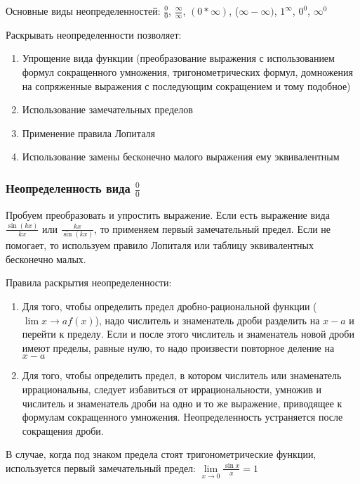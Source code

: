 \documentclass{article}
\begin{document}
\begin{flushleft}

Основные виды неопределенностей: $\frac{0}{0}$, $\frac{\infty}{\infty}$, $(0 * \infty)$, ($\infty - \infty)$, $1^{\infty}$, $0^0$, $\infty^0$

Раскрывать неопределенности позволяет:

\begin{enumerate}
    \item Упрощение вида функции (преобразование выражения с использованием формул сокращенного умножения, тригонометрических формул, домножения на сопряженные выражения с последующим сокращением и тому подобное)
    \item Использование замечательных пределов
    \item Применение правила Лопиталя
    \item Использование замены бесконечно малого выражения ему эквивалентным
\end{enumerate}

\subsubsection{Неопределенность вида $\frac{0}{0}$}

Пробуем преобразовать и упростить выражение. Если есть выражение вида $\frac{\sin (kx)}{kx}$ или $\frac{kx}{\sin (kx)}$, то применяем первый замечательный предел. Если не помогает, то используем правило Лопиталя или таблицу эквивалентных бесконечно малых.

Правила раскрытия неопределенности:

\begin{enumerate}
    \item Для того, чтобы определить предел дробно-рациональной функции ($\lim\limits{x \to a} f(x)$), надо числитель и знаменатель дроби разделить на $x - a$ и перейти к пределу. Если и после этого числитель и знаменатель новой дроби имеют пределы, равные нулю, то надо произвести повторное деление на $x - a$
    \item Для того, чтобы определить предел, в котором числитель или знаменатель иррациональны, следует избавиться от иррациональности, умножив и числитель и знаменатель дроби на одно и то же выражение, приводящее к формулам сокращенного умножения. Неопределенность устраняется после сокращения дроби.
\end{enumerate}

В случае, когда под знаком предела стоят тригонометрические функции, используется первый замечательный предел: $\lim\limits_{x \to 0} \frac{\sin x}{x} = 1$


\end{flushleft}
\end{document}

